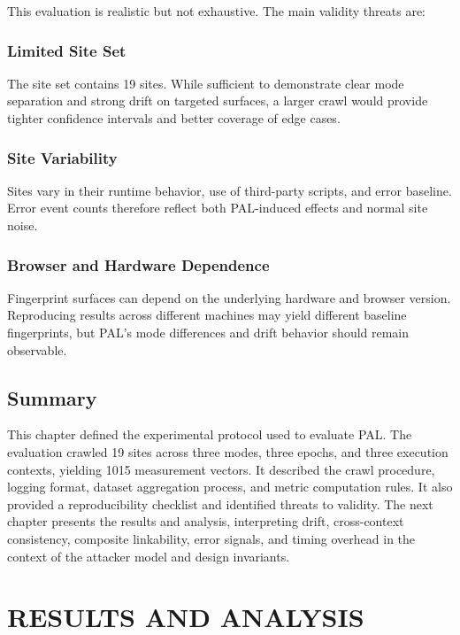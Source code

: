 \documentclass[11pt]{report}
\begin{document}
This evaluation is realistic but not exhaustive. The main validity threats are:

\subsection{Limited Site Set}

The site set contains 19 sites. While sufficient to demonstrate clear mode separation and strong drift on targeted surfaces, a larger crawl would provide tighter confidence intervals and better coverage of edge cases.

\subsection{Site Variability}

Sites vary in their runtime behavior, use of third-party scripts, and error baseline. Error event counts therefore reflect both PAL-induced effects and normal site noise.

\subsection{Browser and Hardware Dependence}

Fingerprint surfaces can depend on the underlying hardware and browser version. Reproducing results across different machines may yield different baseline fingerprints, but PAL’s mode differences and drift behavior should remain observable.

\section{Summary}

This chapter defined the experimental protocol used to evaluate PAL. The evaluation crawled 19 sites across three modes, three epochs, and three execution contexts, yielding 1015 measurement vectors. It described the crawl procedure, logging format, dataset aggregation process, and metric computation rules. It also provided a reproducibility checklist and identified threats to validity. The next chapter presents the results and analysis, interpreting drift, cross-context consistency, composite linkability, error signals, and timing overhead in the context of the attacker model and design invariants.







\chapter{RESULTS AND ANALYSIS}
\end{document}
